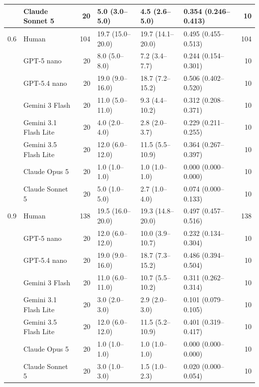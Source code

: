 \documentclass[sigconf,anonymous]{aamas}
\begin{document}
\begin{table}[t]
\begin{tabular}{@{}llrlllr@{}}
         & Claude Sonnet 5 & 20 & 5.0 (3.0--5.0) & 4.5 (2.6--5.0) & 0.354 (0.246--0.413) & 10 \\
        \midrule
        0.6 & Human & 104 & 19.7 (15.0--20.0) & 19.7 (14.1--20.0) & 0.495 (0.455--0.513) & 104 \\
         & GPT-5 nano & 20 & 8.0 (5.0--8.0) & 7.2 (3.4--7.7) & 0.244 (0.154--0.301) & 10 \\
         & GPT-5.4 nano & 20 & 19.0 (9.0--16.0) & 18.7 (7.2--15.2) & 0.506 (0.402--0.520) & 10 \\
         & Gemini 3 Flash & 20 & 11.0 (5.0--11.0) & 9.3 (4.4--10.2) & 0.312 (0.208--0.371) & 10 \\
         & Gemini 3.1 Flash Lite & 20 & 4.0 (2.0--4.0) & 2.8 (2.0--3.7) & 0.229 (0.211--0.255) & 10 \\
         & Gemini 3.5 Flash Lite & 20 & 12.0 (6.0--12.0) & 11.5 (5.5--10.9) & 0.364 (0.267--0.397) & 10 \\
         & Claude Opus 5 & 20 & 1.0 (1.0--1.0) & 1.0 (1.0--1.0) & 0.000 (0.000--0.000) & 10 \\
         & Claude Sonnet 5 & 20 & 5.0 (1.0--5.0) & 2.7 (1.0--4.0) & 0.074 (0.000--0.133) & 10 \\
        \midrule
        0.9 & Human & 138 & 19.5 (16.0--20.0) & 19.3 (14.8--20.0) & 0.497 (0.457--0.516) & 138 \\
         & GPT-5 nano & 20 & 12.0 (6.0--12.0) & 10.0 (3.9--10.7) & 0.232 (0.134--0.304) & 10 \\
         & GPT-5.4 nano & 20 & 19.0 (9.0--16.0) & 18.7 (7.3--15.2) & 0.486 (0.394--0.504) & 10 \\
         & Gemini 3 Flash & 20 & 11.0 (6.0--11.0) & 10.7 (5.5--10.2) & 0.311 (0.262--0.314) & 10 \\
         & Gemini 3.1 Flash Lite & 20 & 3.0 (2.0--3.0) & 2.9 (2.0--3.0) & 0.101 (0.079--0.105) & 10 \\
         & Gemini 3.5 Flash Lite & 20 & 12.0 (6.0--12.0) & 11.5 (5.2--10.9) & 0.401 (0.319--0.417) & 10 \\
         & Claude Opus 5 & 20 & 1.0 (1.0--1.0) & 1.0 (1.0--1.0) & 0.000 (0.000--0.000) & 10 \\
         & Claude Sonnet 5 & 20 & 3.0 (1.0--3.0) & 1.5 (1.0--2.3) & 0.020 (0.000--0.054) & 10 \\
        \bottomrule
    \end{tabular}
\end{table}
\end{document}
